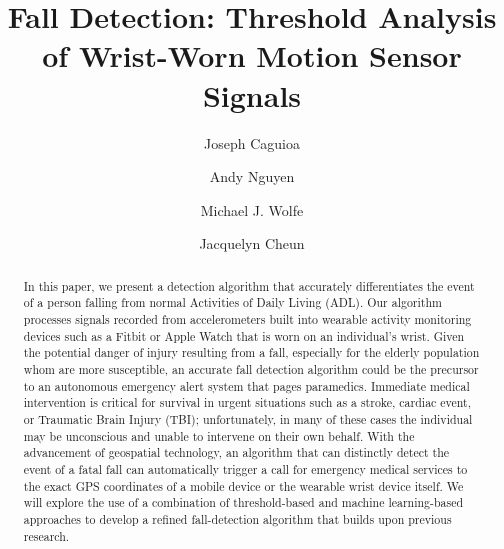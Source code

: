 \documentclass{llncs}
\title{\textbf{Fall Detection: Threshold Analysis of Wrist-Worn Motion Sensor Signals}}
\author{Joseph Caguioa\inst{1}\and Andy Nguyen\inst{1}\and  Michael J. Wolfe\inst{1}\and Jacquelyn Cheun\inst{1}} %
\institute{Master of Science in Data Science, Southern Methodist University, Dallas TX 75275 USA
	      \email{\{jcaguioa, andynguyen, mwolfe, \& jcheun\}@smu.edu} 
	      }
\begin{document}
\maketitle

\begin{abstract}
In this paper, we present a detection algorithm that accurately differentiates the event of a person falling from normal Activities of Daily Living (ADL). Our algorithm processes signals recorded from accelerometers built into wearable activity monitoring devices such as a Fitbit or Apple Watch that is worn on an individual's wrist. Given the potential danger of injury resulting from a fall, especially for the elderly population whom are more susceptible, an accurate fall detection algorithm could be the precursor to an autonomous emergency alert system that pages paramedics. Immediate medical intervention is critical for survival in urgent situations such as a stroke, cardiac event, or Traumatic Brain Injury (TBI); unfortunately, in many of these cases the individual may be unconscious and unable to intervene on their own behalf. With the advancement of geospatial technology, an algorithm that can distinctly detect the event of a fatal fall can automatically trigger a call for emergency medical services to the exact GPS coordinates of a mobile device or the wearable wrist device itself. We will explore the use of a combination of threshold-based and machine learning-based approaches to develop a refined fall-detection algorithm that builds upon previous research. 
\end{abstract}


\end{document}
